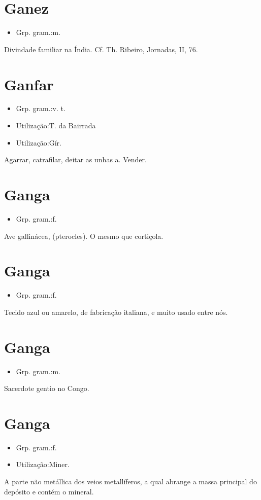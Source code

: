 \section{Ganez}
\begin{itemize}
\item {Grp. gram.:m.}
\end{itemize}
Divindade familiar na Índia. Cf. Th. Ribeiro, \textunderscore Jornadas\textunderscore , II, 76.
\section{Ganfar}
\begin{itemize}
\item {Grp. gram.:v. t.}
\end{itemize}
\begin{itemize}
\item {Utilização:T. da Bairrada}
\end{itemize}
\begin{itemize}
\item {Utilização:Gír.}
\end{itemize}
Agarrar, catrafilar, deitar as unhas a.
Vender.
\section{Ganga}
\begin{itemize}
\item {Grp. gram.:f.}
\end{itemize}
Ave gallinácea, (\textunderscore pterocles\textunderscore ).
O mesmo que \textunderscore cortiçola\textunderscore .
\section{Ganga}
\begin{itemize}
\item {Grp. gram.:f.}
\end{itemize}
Tecido azul ou amarelo, de fabricação italiana, e muito usado entre nós.
\section{Ganga}
\begin{itemize}
\item {Grp. gram.:m.}
\end{itemize}
Sacerdote gentio no Congo.
\section{Ganga}
\begin{itemize}
\item {Grp. gram.:f.}
\end{itemize}
\begin{itemize}
\item {Utilização:Miner.}
\end{itemize}
A parte não metállica dos veios metallíferos, a qual abrange a massa principal do depósito e contém o mineral.
